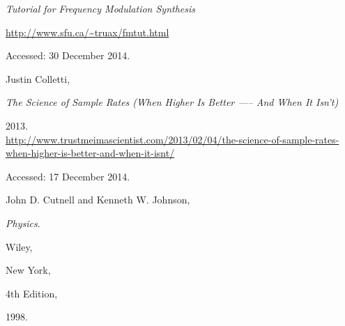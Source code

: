 \documentclass[12pt,twoside]{report}
\begin{document}
\begin{thebibliography}{9}

\emph{Tutorial for Frequency Modulation Synthesis}

\url{http://www.sfu.ca/~truax/fmtut.html}

Accessed: 30 December 2014.


Justin Colletti,

\emph{The Science of Sample Rates (When Higher Is Better —-- And When It Isn't)}

2013.\\
  \url{http://www.trustmeimascientist.com/2013/02/04/the-science-of-sample-rates-when-higher-is-better-and-when-it-isnt/}

Accessed: 17 December 2014.


John D. Cutnell and Kenneth W. Johnson,

\emph{Physics}.

Wiley,

New York,

4th Edition,

1998.

\end{thebibliography}

\listoffigures
\end{document}
